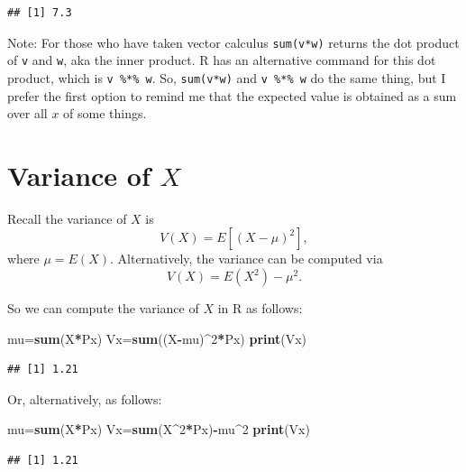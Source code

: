 \documentclass[
]{book}
\newenvironment{Shaded}{\begin{snugshade}}{\end{snugshade}}
\newcommand{\DecValTok}[1]{\textcolor[rgb]{0.00,0.00,0.81}{#1}}
\newcommand{\FunctionTok}[1]{\textcolor[rgb]{0.13,0.29,0.53}{\textbf{#1}}}
\newcommand{\NormalTok}[1]{#1}
\newcommand{\OtherTok}[1]{\textcolor[rgb]{0.56,0.35,0.01}{#1}}
\newcommand{\SpecialCharTok}[1]{\textcolor[rgb]{0.81,0.36,0.00}{\textbf{#1}}}
\theoremstyle{definition}
\theoremstyle{definition}
\theoremstyle{definition}
\theoremstyle{definition}
\theoremstyle{remark}
\begin{document}
\begin{verbatim}
## [1] 7.3
\end{verbatim}

Note: For those who have taken vector calculus \texttt{sum(v*w)} returns the dot product of \texttt{v} and \texttt{w}, aka the inner product. R has an alternative command for this dot product, which is \texttt{v\ \%*\%\ w}. So, \texttt{sum(v*w)} and \texttt{v\ \%*\%\ w} do the same thing, but I prefer the first option to remind me that the expected value is obtained as a sum over all \(x\) of some things.

\section{\texorpdfstring{Variance of \(X\)}{Variance of X}}\label{variance-of-x}

Recall the variance of \(X\) is \[V(X) = E[(X-\mu)^2],\] where \(\mu = E(X)\).
Alternatively, the variance can be computed via
\[V(X) = E(X^2)-\mu^2.\]

So we can compute the variance of \(X\) in R as follows:

\begin{Shaded}
\begin{Highlighting}[]
\NormalTok{mu}\OtherTok{=}\FunctionTok{sum}\NormalTok{(X}\SpecialCharTok{*}\NormalTok{Px) }
\NormalTok{Vx}\OtherTok{=}\FunctionTok{sum}\NormalTok{((X}\SpecialCharTok{{-}}\NormalTok{mu)}\SpecialCharTok{\^{}}\DecValTok{2}\SpecialCharTok{*}\NormalTok{Px)}
\FunctionTok{print}\NormalTok{(Vx)}
\end{Highlighting}
\end{Shaded}

\begin{verbatim}
## [1] 1.21
\end{verbatim}

Or, alternatively, as follows:

\begin{Shaded}
\begin{Highlighting}[]
\NormalTok{mu}\OtherTok{=}\FunctionTok{sum}\NormalTok{(X}\SpecialCharTok{*}\NormalTok{Px)}
\NormalTok{Vx}\OtherTok{=}\FunctionTok{sum}\NormalTok{(X}\SpecialCharTok{\^{}}\DecValTok{2}\SpecialCharTok{*}\NormalTok{Px)}\SpecialCharTok{{-}}\NormalTok{mu}\SpecialCharTok{\^{}}\DecValTok{2}
\FunctionTok{print}\NormalTok{(Vx)}
\end{Highlighting}
\end{Shaded}

\begin{verbatim}
## [1] 1.21
\end{verbatim}
\end{document}

